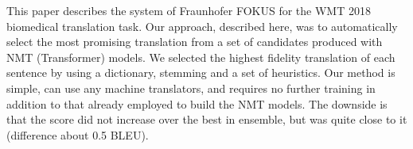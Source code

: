 This paper describes the system of Fraunhofer FOKUS for the WMT 2018 biomedical translation task. Our approach, described here, was to automatically select the most promising translation from a set of candidates produced with NMT (Transformer) models. We selected the highest fidelity translation of each sentence by using a dictionary, stemming and a set of heuristics. Our method is simple, can use any machine translators, and requires no further training in addition to that already employed to build the NMT models. The downside is that the score did not increase over the best in ensemble, but was quite close to it (difference about 0.5 BLEU).
